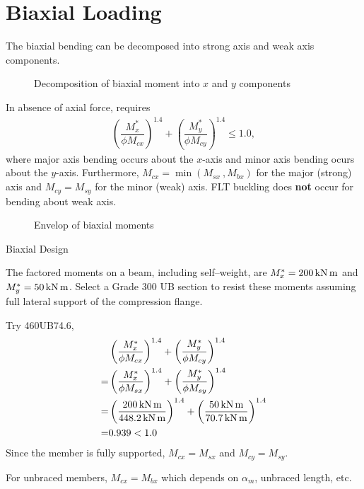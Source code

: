 \section{Biaxial Loading}
The biaxial bending can be decomposed into strong axis and weak axis components.
\begin{figure}[H]
\centering\caption{Decomposition of biaxial moment into $x$ and $y$ components}
\end{figure}
In absence of axial force,  requires
\begin{align}
\left(\dfrac{M^*_x}{\phi{}M_{cx}}\right)^{1.4}+\left(\dfrac{M^*_y}{\phi{}M_{cy}}\right)^{1.4}\leqslant1.0,
\end{align}
where major axis bending occurs about the $x$-axis and minor axis bending ocurs about the $y$-axis. Furthermore, $M_{cx}=\min\left(M_{sx}~,M_{bx}\right)$ for the major (strong) axis and $M_{cy}=M_{sy}$ for the minor (weak) axis. FLT buckling does \textbf{not} occur for bending about weak axis.
\begin{figure}[H]
\centering\caption{Envelop of biaxial moments}
\end{figure}
\clearpage
\begin{exmp}
Biaxial Design

The factored moments on a beam, including self--weight, are $M^*_x=\SI{200}{\kilo\newton\meter}$ and $M^*_y=\SI{50}{\kilo\newton\meter}$. Select a Grade 300 UB section to resist these moments assuming full lateral support of the compression flange.
\end{exmp}
\begin{solution}
Try 460UB74.6,
\begin{align*}
&\left(\dfrac{M^*_x}{\phi{}M_{cx}}\right)^{1.4}+\left(\dfrac{M^*_y}{\phi{}M_{cy}}\right)^{1.4}\\
=&\left(\dfrac{M^*_x}{\phi{}M_{sx}}\right)^{1.4}+\left(\dfrac{M^*_y}{\phi{}M_{sy}}\right)^{1.4}\\
=&\left(\dfrac{\SI{200}{\kilo\newton\meter}}{\SI{448.2}{\kilo\newton\meter}}\right)^{1.4}+\left(\dfrac{\SI{50}{\kilo\newton\meter}}{\SI{70.7}{\kilo\newton\meter}}\right)^{1.4}\\
=&0.939<1.0
\end{align*}
Since the member is fully supported, $M_{cx}=M_{sx}$ and $M_{cy}=M_{sy}$.

For unbraced members, $M_{cx}=M_{bx}$ which depends on $\alpha_m$, unbraced length, etc.
\end{solution}
